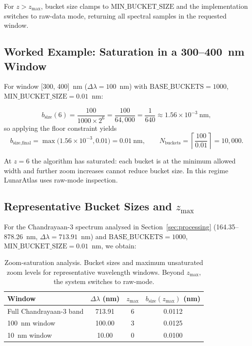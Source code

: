 \documentclass[12pt,a4paper]{article}
\begin{document}
For \(z > z_{\max}\), bucket size clamps to \(\text{MIN\_BUCKET\_SIZE}\) and the implementation switches to raw-data mode, returning all spectral samples in the requested window.

\subsection{Worked Example: Saturation in a 300--400~nm Window}

For window [300, 400]~nm (\(\Delta\lambda = 100\)~nm) with \(\text{BASE\_BUCKETS} = 1000\), \(\text{MIN\_BUCKET\_SIZE} = 0.01\)~nm:

\[
b_{\text{size}}(6) = \frac{100}{1000\times 2^6} = \frac{100}{64{,}000} = \frac{1}{640} \approx 1.56\times 10^{-3}\ \text{nm}, \tag{8}
\]
so applying the floor constraint yields
\[
b_{\text{size,final}} = \max\bigl(1.56\times10^{-3}, 0.01\bigr) = 0.01\ \text{nm},\qquad
N_{\text{buckets}} = \left\lceil \frac{100}{0.01} \right\rceil = 10{,}000. \tag{9}
\]

At \(z=6\) the algorithm has saturated: each bucket is at the minimum allowed width and further zoom increases cannot reduce bucket size. In this regime LunarAtlas uses raw-mode inspection.

\subsection{Representative Bucket Sizes and $z_{\max}$}

For the Chandrayaan-3 spectrum analysed in Section~\ref{sec:processing} (164.35--878.26~nm, \(\Delta\lambda = 713.91\)~nm) and \(\text{BASE\_BUCKETS} = 1000\), \(\text{MIN\_BUCKET\_SIZE} = 0.01\)~nm, we obtain:

\begin{table}[H]
  \centering
  \caption{Zoom-saturation analysis. Bucket sizes and maximum unsaturated zoom levels for representative wavelength windows. Beyond \(z_{\max}\), the system switches to raw-mode.}
  \label{tab:zmax}
  \begin{tabular}{@{}lccc@{}}
    \toprule
    Window & $\Delta\lambda$ (nm) & $z_{\max}$ & $b_{\text{size}}(z_{\max})$ (nm) \\
    \midrule
    Full Chandrayaan-3 band & 713.91 & 6 & 0.0112 \\
    100~nm window           & 100.00 & 3 & 0.0125 \\
    10~nm window            & 10.00  & 0 & 0.0100 \\
    \bottomrule
  \end{tabular}
\end{table}
\end{document}
